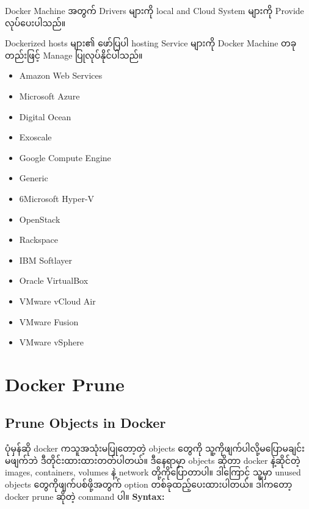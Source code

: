 \documentclass[]{article}
\newenvironment{Shaded}{}{}
\newcommand{\ExtensionTok}[1]{#1}
\newcommand{\NormalTok}[1]{#1}
\providecommand{\tightlist}{%
  \setlength{\itemsep}{0pt}\setlength{\parskip}{0pt}}
\begin{document}
Docker Machine အတွက် Drivers များကို local and Cloud System များကို
Provide လုပ်ပေးပါသည်။

Dockerized hosts များ၏ ဖော်ပြပါ hosting Service များကို Docker Machine
တခုတည်းဖြင့် Manage ပြုလုပ်နိုင်ပါသည်။

\begin{itemize}
\tightlist
\item
  Amazon Web Services
\item
  Microsoft Azure
\item
  Digital Ocean
\item
  Exoscale
\item
  Google Compute Engine
\item
  Generic
\item
  6Microsoft Hyper-V
\item
  OpenStack
\item
  Rackspace
\item
  IBM Softlayer
\item
  Oracle VirtualBox
\item
  VMware vCloud Air
\item
  VMware Fusion
\item
  VMware vSphere
\end{itemize}

\pagebreak

\hypertarget{docker-prune}{%
\section{Docker Prune}\label{docker-prune}}

\hypertarget{prune-objects-in-docker}{%
\subsection{Prune Objects in Docker}\label{prune-objects-in-docker}}

ပုံမှန်ဆို docker ကသူအသုံးမပြုတော့တဲ့ objects ‌တွေကို
သူ့ကိုဖျက်ပါလို့မပြောမချင်း မဖျက်ဘဲ ဒီတိုင်းထားထားတတ်ပါတယ်။ ဒီနေရာမှာ
objects ဆိုတာ docker နဲ့ဆိုင်တဲ့ images, containers, volumes နဲ့ network
တို့ကိုပြောတာပါ။ ဒါကြောင့် သူ့မှာ unused objects တွေကိုဖျက်ပစ်ဖို့အတွက်
option တစ်ခုထည့်ပေးထားပါတယ်။ ဒါကတော့ docker prune ဆိုတဲ့ command ပါ။
\textbf{Syntax:}

\begin{Shaded}
\end{Shaded}
\end{document}
